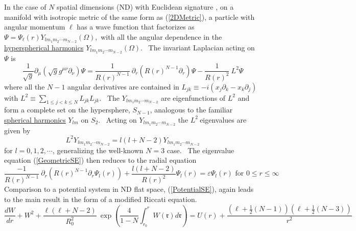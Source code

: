 \documentclass{article}%
\begin{document}
In the case of $N$ spatial dimensions (ND) with Euclidean signature
\cite{Green}, on a manifold with isotropic metric of the same form as
(\ref{2DMetric}), a particle with angular momentum $\ell$ has a wave function
that factorizes as $\Psi=\Psi_{\ell}\left(  r\right)  Y_{lm_{1}m_{2}\cdots
m_{N-2}}\left(  \Omega\right)  $,\ with all the angular dependence in the
\href{https://en.wikipedia.org/wiki/Spherical_harmonics}{hyperspherical
harmonics} $Y_{lm_{1}m_{2}\cdots m_{N-2}}\left(  \Omega\right)  $. \ The
invariant Laplacian acting on $\Psi$ is
\begin{equation}
\frac{1}{\sqrt{g}}\partial_{\mu}\left(  \sqrt{g}g^{\mu\nu}\partial_{\nu
}\right)  \Psi=\frac{1}{R\left(  r\right)  ^{N-1}}~\partial_{r}\left(
R\left(  r\right)  ^{N-1}\partial_{r}\right)  \Psi-\frac{1}{R\left(  r\right)
^{2}}~L^{2}\Psi
\end{equation}
where all the $N-1$ angular derivatives are contained in $L_{jk}%
\equiv-i\left(  x_{j}\partial_{k}-x_{k}\partial_{j}\right)  $ with
$L^{2}\equiv\sum_{1\leq j<k\leq N}L_{jk}L_{jk}$. \ The $Y_{lm_{1}m_{2}\cdots
m_{N-2}}$ are eigenfunctions of $L^{2}$ and form a complete set on the
hypersphere, $S_{N-1}$, analogous to the familiar
\href{https://en.wikipedia.org/wiki/Spherical_harmonics}{spherical harmonics}
$Y_{lm}$ on $S_{2}$. \ Acting on $Y_{lm_{1}m_{2}\cdots m_{N-2}}$ the $L^{2}%
\ $eigenvalues are given by \cite{Sommerfeld}
\begin{equation}
L^{2}Y_{lm_{1}m_{2}\cdots m_{N-2}}=l\left(  l+N-2\right)  Y_{lm_{1}m_{2}\cdots
m_{N-2}}%
\end{equation}
for $l=0,1,2,\cdots$, generalizing the well-known $N=3$ case. \ The eigenvalue
equation (\ref{GeometricSE}) then reduces to the radial equation%
\begin{equation}
\frac{-1}{R\left(  r\right)  ^{N-1}}~\partial_{r}\left(  R\left(  r\right)
^{N-1}\partial_{r}\Psi_{l}\left(  r\right)  \right)  +\frac{l\left(
l+N-2\right)  }{R\left(  r\right)  ^{2}}\Psi_{l}\left(  r\right)
=\varepsilon\Psi_{l}\left(  r\right)  \text{ \ \ for \ \ }0\leq r\leq\infty
\end{equation}
Comparison to a potential system in ND flat space, (\ref{PotentialSE}), again
leads to the main result in the form of a modified Riccati equation.
\begin{equation}
\frac{dW}{dr}+W^{2}+\frac{\ell\left(  \ell+N-2\right)  }{R_{0}^{2}}%
~\exp\left(  \frac{4}{1-N}\int_{r_{0}}^{r}W\left(  \mathfrak{r}\right)
d\mathfrak{r}\right)  =U\left(  r\right)  +\frac{\left(  \ell+\frac{1}%
{2}\left(  N-1\right)  \right)  \left(  \ell+\frac{1}{2}\left(  N-3\right)
\right)  }{r^{2}} \label{NDGeomFromPotl}%
\end{equation}
\end{document}
